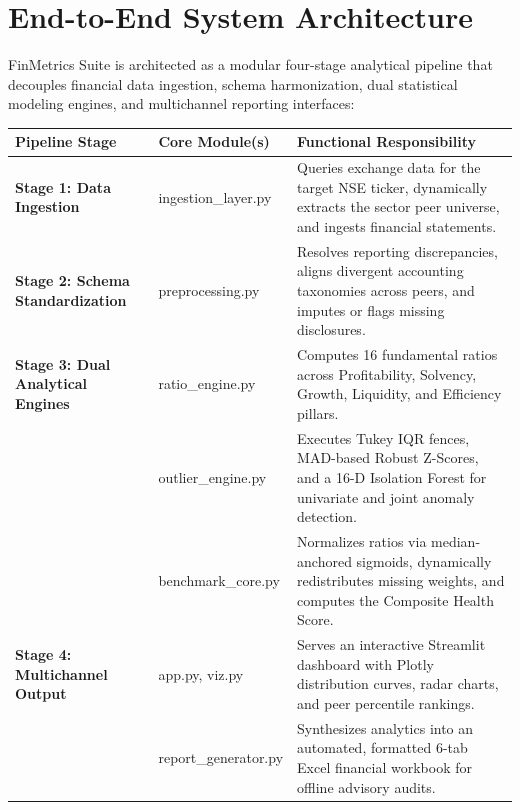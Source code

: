 
\section{End-to-End System Architecture}

FinMetrics Suite is architected as a modular four-stage analytical pipeline that decouples financial data ingestion, schema harmonization, dual statistical modeling engines, and multichannel reporting interfaces:

\begin{table}[H]
\centering
\small
\renewcommand{\arraystretch}{1.12}
\begin{tabularx}{\textwidth}{>{\bfseries\color{pureblack}}l >{\ttfamily\footnotesize}l X}
\toprule
\rowcolor{tableheadbg}
\textbf{Pipeline Stage} & \textbf{Core Module(s)} & \textbf{Functional Responsibility} \\
\midrule
Stage 1: Data Ingestion & ingestion\_layer.py & Queries exchange data for the target NSE ticker, dynamically extracts the sector peer universe, and ingests financial statements. \\
\rowcolor{tablerowbg}
Stage 2: Schema Standardization & preprocessing.py & Resolves reporting discrepancies, aligns divergent accounting taxonomies across peers, and imputes or flags missing disclosures. \\
Stage 3: Dual Analytical Engines & ratio\_engine.py & Computes 16 fundamental ratios across Profitability, Solvency, Growth, Liquidity, and Efficiency pillars. \\
\rowcolor{tablerowbg}
 & outlier\_engine.py & Executes Tukey IQR fences, MAD-based Robust Z-Scores, and a 16-D Isolation Forest for univariate and joint anomaly detection. \\
 & benchmark\_core.py & Normalizes ratios via median-anchored sigmoids, dynamically redistributes missing weights, and computes the Composite Health Score. \\
\rowcolor{tablerowbg}
Stage 4: Multichannel Output & app.py, viz.py & Serves an interactive Streamlit dashboard with Plotly distribution curves, radar charts, and peer percentile rankings. \\
 & report\_generator.py & Synthesizes analytics into an automated, formatted 6-tab Excel financial workbook for offline advisory audits. \\
\bottomrule
\end{tabularx}
\end{table}
